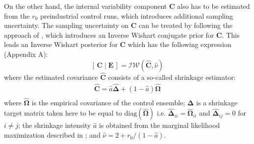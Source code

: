 \documentclass[12pt]{article}
\newcommand{\Sig}{\mbox{\boldmath \(\Sigma\)}}
\newcommand{\Om}{\boldsymbol{\Omega}}
\newcommand{\E}{\mathbf{E}}
\begin{document}
 On the other hand, the internal variability component $\mathbf C$ also has to be estimated from the $r_0$ preindustrial control runs, which introduces additional sampling uncertainty. The sampling uncertainty on $\mathbf C$ can be treated by following the approach of \cite{Han16}, which introduces an Inverse Wishart conjugate prior for $\mathbf C$. This leads an Inverse Wishart posterior for $\mathbf C$ which has the following expression (Appendix A):
\begin{equation} 
\label{wishart}
\left[\,\mathbf{C}\mid \E\,\right] = \mathcal{IW}(\widehat{\mathbf{C}},\widehat{\nu})
\end{equation}
where the estimated covariance $\widehat{\mathbf{C}}$ consists of a so-called shrinkage estimator:
\begin{equation} 
\label{wishart2}
\begin{array}{ll}
\widehat{\mathbf{C}} = \widehat{a} \widehat{\boldsymbol{\Delta}}+ (1-\widehat{a})\widehat{\Om}\\
\end{array}
\end{equation}
where $\widehat{\Om}$ is the empirical covariance of the control ensemble; $\boldsymbol{\Delta}$ is a shrinkage target matrix taken here to be equal to $\textrm{diag}(\widehat{\Om})$ i.e. $\widehat{\boldsymbol{\Delta}}_{ii}=\widehat{\Om}_{ii}$ and $\widehat{\boldsymbol{\Delta}}_{ij}=0$ for $i\neq j$; the shrinkage intensity $\widehat{a}$ is obtained from the marginal likelihood maximization described in \cite{HN14}; and $\widehat{\nu}= 2+ r_0/(1-\widehat a)$.
\end{document}
